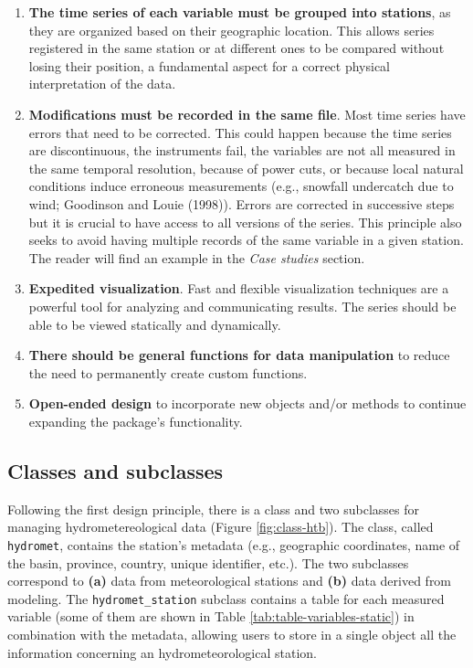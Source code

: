 \begin{enumerate}
\def\labelenumi{\arabic{enumi}.}
\item
  \textbf{The time series of each variable must be grouped into stations},
  as they are organized based on their geographic location. This allows
  series registered in the same station or at different ones to be
  compared without losing their position, a fundamental aspect for a
  correct physical interpretation of the data.
\item
  \textbf{Modifications must be recorded in the same file}. Most time
  series have errors that need to be corrected. This could happen
  because the time series are discontinuous, the instruments fail, the
  variables are not all measured in the same temporal resolution,
  because of power cuts, or because local natural conditions
  induce erroneous measurements (e.g., snowfall undercatch
  due to wind; Goodinson and Louie (1998)). Errors are corrected in successive
  steps but it is crucial to have access to all versions of the
  series. This principle also seeks to avoid having multiple records
  of the same variable in a given station. The reader will find
  an example in the \emph{Case studies} section.
\item
  \textbf{Expedited visualization}. Fast and flexible visualization
  techniques are a powerful tool for analyzing and communicating results.
  The series should be able to be viewed statically and dynamically.
\item
  \textbf{There should be general functions for data manipulation} to
  reduce the need to permanently create custom functions.
\item
  \textbf{Open-ended design} to incorporate new objects and/or methods to
  continue expanding the package's functionality.
\end{enumerate}

\hypertarget{classes-and-subclasses}{%
\subsection{Classes and subclasses}\label{classes-and-subclasses}}

Following the first design principle, there is a class and two
subclasses for managing hydrometereological data (Figure \ref{fig:class-htb}).
The class, called \texttt{hydromet},
contains the station's metadata (e.g., geographic coordinates, name of
the basin, province, country, unique identifier, etc.). The two
subclasses correspond to \textbf{(a)} data from meteorological stations and
\textbf{(b)} data derived from modeling. The \texttt{hydromet\_station} subclass
contains a table for each measured variable (some of them are shown in
Table
\ref{tab:table-variables-static})
in combination with the metadata, allowing users to store in a single
object all the information concerning an hydrometeorological station.

